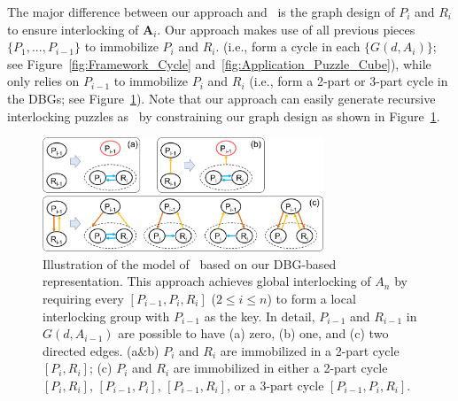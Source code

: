 The major difference between our approach and~\cite{Song-2012-InterCubes} is the graph design of $P_i$ and $R_i$ to ensure interlocking of $\mathbf{A}_i$. Our approach makes use of all previous pieces $\{P_1, ..., P_{i-1}\}$ to immobilize $P_i$ and $R_i$.  (i.e., form a cycle in each $\{G(d, A_i)\}$; see Figure~\ref{fig:Framework_Cycle} and~\ref{fig:Application_Puzzle_Cube}), while~\cite{Song-2012-InterCubes} only relies on $P_{i-1}$ to immobilize $P_i$ and $R_i$ (i.e., form a 2-part or 3-part cycle in the DBGs; see Figure~\ref{fig:Application_Puzzle_Model}).
Note that our approach can easily generate recursive interlocking puzzles as~\cite{Song-2012-InterCubes} by constraining our graph design as shown in Figure~\ref{fig:Application_Puzzle_Model}.

\begin{figure}[!t]
	\centering
	\includegraphics[width=8.40cm]{images/Application_Puzzle_Model.png}
	\vspace*{-2.5mm}
	\caption{
		Illustration of the model of~\cite{Song-2012-InterCubes} based on our DBG-based representation. This approach achieves global interlocking of $A_n$ by requiring every $[P_{i-1}, P_i, R_i]$ ($2 \leq i\leq n$) to form a local interlocking group with $P_{i-1}$ as the key.
		In detail, $P_{i-1}$ and $R_{i-1}$ in $G(d, A_{i-1})$ are possible to have (a) zero, (b) one, and (c) two directed edges.
		(a\&b) $P_i$ and $R_i$ are immobilized in a 2-part cycle $[P_i, R_i]$;
		(c) $P_i$ and $R_i$ are immobilized in either a 2-part cycle $[P_i, R_i]$, $[P_{i-1}, P_i]$, $[P_{i-1}, R_i]$, or a 3-part cycle $[P_{i-1}, P_i, R_i]$.
	}
	\vspace*{-4.0mm}
	\label{fig:Application_Puzzle_Model}
\end{figure}




